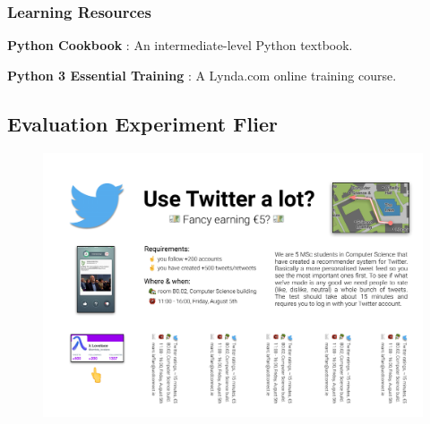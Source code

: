 \documentclass{article}
\begin{document}
\subsubsection*{Learning Resources}
\begin{itemize*}
    \item \textbf{Python Cookbook} \cite{cookbook}: An intermediate-level Python textbook.
    \item \textbf{Python 3 Essential Training} \cite{lynda}: A Lynda.com online training course.
\end{itemize*}

\newpage

\subsection{Evaluation Experiment Flier} \label{full-size-poster}
\begin{figure}[H]
    \centering
    \includegraphics[width=1.5\textwidth,angle=90,origin=c]{evaluation_poster}
\end{figure}


\newpage
\end{document}
